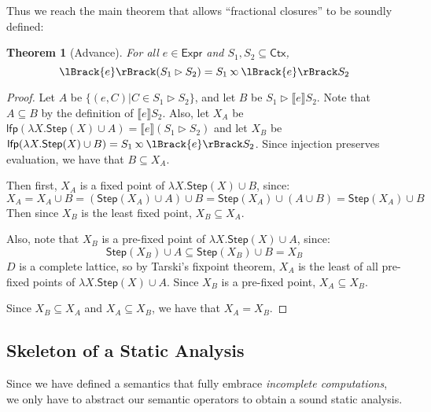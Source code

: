 \documentclass[acmsmall,review]{acmart}\settopmatter{printfolios=true,printccs=false,printacmref=false}
\theoremstyle{definition}
\theoremstyle{plain}
\newtheorem{thm}{Theorem}[section]
\newcommand*{\Expr}{\mathsf{Expr}}
\newcommand*{\Ctx}{\mathsf{Ctx}}
\newcommand*{\lfp}{\mathsf{lfp}}
\newcommand*{\Step}{\mathsf{Step}}
\newcommand*{\semlink}{\mathbin{\rotatebox[origin=c]{180}{$\propto$}}}
\newcommand*{\sembracket}[1]{\lBrack{#1}\rBrack}
\begin{document}
Thus we reach the main theorem that allows ``fractional closures'' to be soundly defined:
\begin{thm}[Advance]
  For all $e\in\Expr$ and $S_1,S_2\subseteq\Ctx$,
  \[\sembracket{e}(S_1\rhd S_2)=S_1\semlink\sembracket{e}S_2\]
\end{thm}
\begin{proof}
  Let $A$ be $\{(e,C)|C\in S_1\rhd S_2\}$, and let $B$ be $S_1\rhd\sembracket{e}S_2$.
  Note that $A\subseteq B$ by the definition of $\sembracket{e}S_2$.
  Also, let $X_A$ be $\lfp(\lambda X.\Step(X)\cup A)=\sembracket{e}(S_1\rhd S_2)$ and let $X_B$ be $\lfp(\lambda X.\Step(X)\cup B)=S_1\semlink\sembracket{e}S_2$.
  Since injection preserves evaluation, we have that $B\subseteq X_A$.

  Then first, $X_A$ is a fixed point of $\lambda X.\Step(X)\cup B$, since:
  \[X_A=X_A\cup B=(\Step(X_A)\cup A)\cup B=\Step(X_A)\cup(A\cup B)=\Step(X_A)\cup B\]
  Then since $X_B$ is the least fixed point, $X_B\subseteq X_A$.

  Also, note that $X_B$ is a pre-fixed point of $\lambda X.\Step(X)\cup A$, since:
  \[\Step(X_B)\cup A\subseteq\Step(X_B)\cup B=X_B\]
  $D$ is a complete lattice, so by Tarski's fixpoint theorem, $X_A$ is the least of all pre-fixed points of $\lambda X.\Step(X)\cup A$.
  Since $X_B$ is a pre-fixed point, $X_A\subseteq X_B$.

  Since $X_B\subseteq X_A$ and $X_A\subseteq X_B$, we have that $X_A=X_B$.
\end{proof}

\subsection{Skeleton of a Static Analysis}
Since we have defined a semantics that fully embrace \emph{incomplete computations}, we only have to abstract our semantic operators to obtain a sound static analysis.
\end{document}
